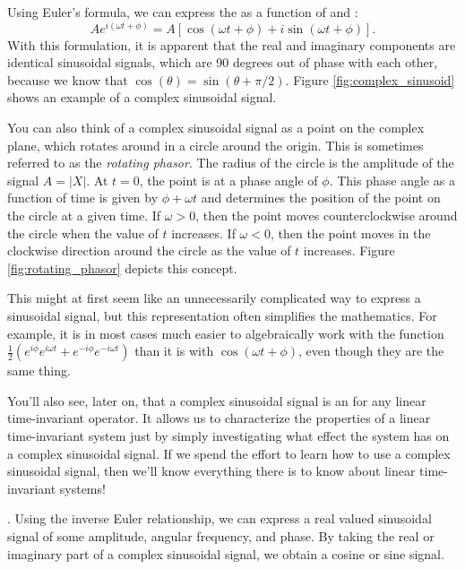 Using Euler's formula, we can express the  as a function of \index{$\cos$}{$\cos$} and \index{$\sin$}{$\sin$}:
\begin{equation}
Ae^{i(\omega t + \phi)}= A[\cos(\omega t + \phi) + i \sin(\omega t + \phi)].
\end{equation}
With this formulation, it is apparent that the real and imaginary components are identical sinusoidal signals, which are 90 degrees out of phase with each other, because we know that $\cos(\theta)
= \sin(\theta + \pi/2)$. Figure \ref{fig:complex_sinusoid} shows an example of a complex sinusoidal signal.

You can also think of a complex sinusoidal signal as a point on the complex plane, which rotates around in a circle around the origin. This is sometimes referred to as the \emph{rotating phasor}. The radius of the circle is the amplitude of the signal $A=|X|$. At $t=0$, the point is at a phase angle of $\phi$. This phase angle as a function of time is given by $\phi + \omega t$ and determines the position of the point on the circle at a given time. If $\omega>0$, then the point moves counterclockwise around the circle when the value of $t$ increases. If $\omega < 0$, then the point moves
in the clockwise direction around the circle as the value of $t$ increases. Figure \ref{fig:rotating_phasor} depicts this concept.

This might at first seem like an unnecessarily complicated way to express a sinusoidal signal, but this representation often simplifies the mathematics. For example, it is in most cases much easier to algebraically work with the function $\frac{1}{2}(e^{i\phi}e^{i\omega
t}+e^{-i\phi}e^{-i\omega t})$ than it is with $\cos(\omega t + \phi)$, even though they are the same thing.

You'll also see, later on, that a complex sinusoidal signal is
an \emph{} for any linear
time-invariant operator. It allows us to characterize the properties of a linear time-invariant system just by simply investigating what effect the system has on a complex sinusoidal signal. If we spend the effort to learn how to use a complex sinusoidal signal, then we'll know everything there is to know about linear time-invariant systems!

. Using the inverse Euler relationship, we can express a real valued sinusoidal signal of some amplitude, angular frequency, and phase. By taking the real or imaginary part of a complex sinusoidal signal, we obtain a cosine or sine signal.


